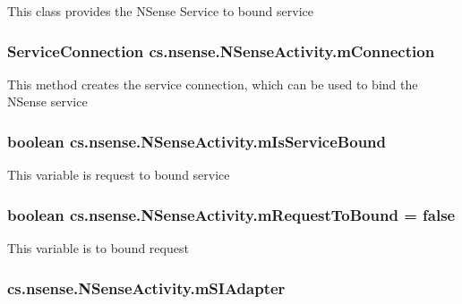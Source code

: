 This class provides the N\-Sense Service to bound service \hypertarget{classcs_1_1nsense_1_1_n_sense_activity_aa8df1068177c5acdb37d8aac72263297}{
\subsubsection[{m\-Connection}]{\setlength{\rightskip}{0pt plus 5cm}Service\-Connection cs.\-nsense.\-N\-Sense\-Activity.\-m\-Connection\hspace{0.3cm}{\ttfamily [private]}}}\label{classcs_1_1nsense_1_1_n_sense_activity_aa8df1068177c5acdb37d8aac72263297}
This method creates the service connection, which can be used to bind the N\-Sense service \hypertarget{classcs_1_1nsense_1_1_n_sense_activity_a9c152811e5c46167941994003e30ffe1}{
\subsubsection[{m\-Is\-Service\-Bound}]{\setlength{\rightskip}{0pt plus 5cm}boolean cs.\-nsense.\-N\-Sense\-Activity.\-m\-Is\-Service\-Bound\hspace{0.3cm}{\ttfamily [private]}}}\label{classcs_1_1nsense_1_1_n_sense_activity_a9c152811e5c46167941994003e30ffe1}
This variable is request to bound service \hypertarget{classcs_1_1nsense_1_1_n_sense_activity_a434e53ab6841f0f85cbaec01bbf99811}{
\subsubsection[{m\-Request\-To\-Bound}]{\setlength{\rightskip}{0pt plus 5cm}boolean cs.\-nsense.\-N\-Sense\-Activity.\-m\-Request\-To\-Bound = false\hspace{0.3cm}{\ttfamily [private]}}}\label{classcs_1_1nsense_1_1_n_sense_activity_a434e53ab6841f0f85cbaec01bbf99811}
This variable is to bound request \hypertarget{classcs_1_1nsense_1_1_n_sense_activity_a3a2e7482cff1bcc969c39b9b672cec60}{
\subsubsection[{m\-S\-I\-Adapter}]{ cs.\-nsense.\-N\-Sense\-Activity.\-m\-S\-I\-Adapter\hspace{0.3cm}{\ttfamily [private]}}}\label{classcs_1_1nsense_1_1_n_sense_activity_a3a2e7482cff1bcc969c39b9b672cec60}
